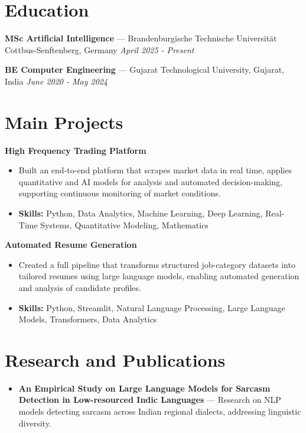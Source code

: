 \documentclass[a4paper,10pt]{article}
\begin{document}
\section*{Education}
\textbf{MSc Artificial Intelligence} — Brandenburgische Technische Universität Cottbus-Senftenberg, Germany \hfill \textit{April 2025 - Present}\par
\vspace{1.5pt}
\textbf{BE Computer Engineering} — Gujarat Technological University, Gujarat, India \hfill \textit{June 2020 - May 2024}\par

\section*{Main Projects}
\textbf{High Frequency Trading Platform}\par
\vspace{1pt}
\begin{itemize}
  \item Built an end-to-end platform that scrapes market data in real time, applies quantitative and AI models for analysis and automated decision-making, supporting continuous monitoring of market conditions.
  \item \textbf{Skills:} Python, Data Analytics, Machine Learning, Deep Learning, Real-Time Systems, Quantitative Modeling, Mathematics
\end{itemize}
\vspace{3pt}
\textbf{Automated Resume Generation}\par
\vspace{1pt}
\begin{itemize}
  \item Created a full pipeline that transforms structured job-category datasets into tailored resumes using large language models, enabling automated generation and analysis of candidate profiles.
  \item \textbf{Skills:} Python, Streamlit, Natural Language Processing, Large Language Models, Transformers, Data Analytics
\end{itemize}

\section*{Research and Publications}
\begin{itemize}
\item \textbf{An Empirical Study on Large Language Models for Sarcasm Detection in Low-resourced Indic Languages} — Research on NLP models detecting sarcasm across Indian regional dialects, addressing linguistic diversity.
\end{itemize}
\end{document}
